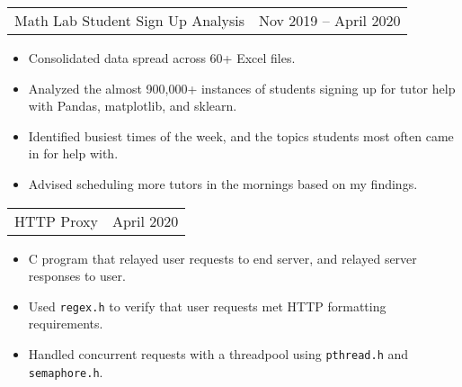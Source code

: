 \documentclass{article}
\newenvironment{compactItemize}{
  \begin{itemize}[itemsep=0ex, parsep=0ex, partopsep=0ex, topsep= -7pt]
}{
  \end{itemize}
}
\newcommand{\project}[2]{
  \begingroup
  \setlength{\tabcolsep}{0ex}
  \begin{tabularx}{\linewidth}{X r}
    #1 & %
    #2\\ %
  \end{tabularx}%
  \endgroup%
}
\begin{document}
\project{Math Lab Student Sign Up Analysis}{Nov 2019 -- April 2020}
\begin{compactItemize}
  \item Consolidated data spread across 60+ Excel files.
  \item Analyzed the almost 900,000+ instances of students signing up for tutor help with Pandas, matplotlib, and sklearn.
  \item Identified busiest times of the week, and the topics students most often came in for help with.
  \item Advised scheduling more tutors in the mornings based on my findings.
\end{compactItemize}
\medskip

\project{HTTP Proxy}{April 2020}
\begin{compactItemize}
  \item C program that relayed user requests to end server, and relayed server responses to user.
  \item Used \texttt{regex.h} to verify that user requests met HTTP formatting requirements.
  \item Handled concurrent requests with a threadpool using \texttt{pthread.h} and \texttt{semaphore.h}.
\end{compactItemize}
\medskip
\end{document}
